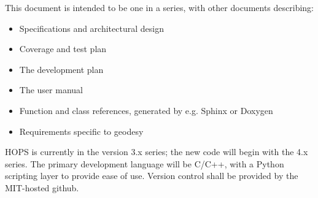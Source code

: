 






This document is intended to be one in a series, with other documents
describing:
\begin{itemize}
\item Specifications and architectural design
\item Coverage and test plan
\item The development plan
\item The user manual
\item Function and class references, generated by e.g. Sphinx or Doxygen
\item Requirements specific to geodesy
\end{itemize}


\acs{HOPS} is currently in the version 3.x series; the new code will
begin with the 4.x series.
The primary development language will be C/C++, with a Python scripting layer
to provide ease of use. Version control shall be provided by the MIT-hosted
github. 








%
%
